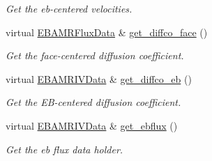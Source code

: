 \begin{DoxyCompactItemize}
\begin{DoxyCompactList}\small\item\em Get the eb-\/centered velocities. \end{DoxyCompactList}\item 
virtual \hyperlink{type__definitions_8H_aadad278b2e5d3d4abcf9032f90ba78c3}{E\+B\+A\+M\+R\+Flux\+Data} \& \hyperlink{classcdr__solver_a5b8564a55df0191ed179b10dc5f6f634}{get\+\_\+diffco\+\_\+face} ()
\begin{DoxyCompactList}\small\item\em Get the face-\/centered diffusion coefficient. \end{DoxyCompactList}\item 
virtual \hyperlink{type__definitions_8H_a6b8fa905d55cbb491b52180386f0e0c1}{E\+B\+A\+M\+R\+I\+V\+Data} \& \hyperlink{classcdr__solver_a49c42fe26beedfe34d757fb05f32e2b9}{get\+\_\+diffco\+\_\+eb} ()
\begin{DoxyCompactList}\small\item\em Get the E\+B-\/centered diffusion coefficient. \end{DoxyCompactList}\item 
virtual \hyperlink{type__definitions_8H_a6b8fa905d55cbb491b52180386f0e0c1}{E\+B\+A\+M\+R\+I\+V\+Data} \& \hyperlink{classcdr__solver_a389f90f50748f97d319f3fec388d4b9b}{get\+\_\+ebflux} ()
\begin{DoxyCompactList}\small\item\em Get the eb flux data holder. \end{DoxyCompactList}\end{DoxyCompactItemize}
